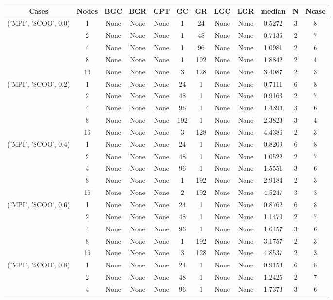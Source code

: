 \begin{tabular}{cccccccccccc}
\hline
Cases & Nodes& BGC& BGR& CPT& GC& GR& LGC& LGR& median & N & Ncase \\
\hline
\multirow{5}{*}{('MPI', 'SCOO', 0.0)}& 1& None& None& None& 1& 24& None& None& 0.5272& 3& 8\\
& 2& None& None& None& 1& 48& None& None& 0.7135& 2& 7\\
& 4& None& None& None& 1& 96& None& None& 1.0981& 2& 6\\
& 8& None& None& None& 1& 192& None& None& 1.8842& 2& 4\\
& 16& None& None& None& 3& 128& None& None& 3.4087& 2& 3\\
\hline
\multirow{5}{*}{('MPI', 'SCOO', 0.2)}& 1& None& None& None& 24& 1& None& None& 0.7111& 6& 8\\
& 2& None& None& None& 48& 1& None& None& 0.9163& 2& 7\\
& 4& None& None& None& 96& 1& None& None& 1.4394& 3& 6\\
& 8& None& None& None& 192& 1& None& None& 2.3823& 3& 4\\
& 16& None& None& None& 3& 128& None& None& 4.4386& 2& 3\\
\hline
\multirow{5}{*}{('MPI', 'SCOO', 0.4)}& 1& None& None& None& 24& 1& None& None& 0.8209& 6& 8\\
& 2& None& None& None& 48& 1& None& None& 1.0522& 2& 7\\
& 4& None& None& None& 96& 1& None& None& 1.5551& 3& 6\\
& 8& None& None& None& 1& 192& None& None& 2.9184& 2& 3\\
& 16& None& None& None& 2& 192& None& None& 4.5247& 3& 3\\
\hline
\multirow{5}{*}{('MPI', 'SCOO', 0.6)}& 1& None& None& None& 24& 1& None& None& 0.8762& 6& 8\\
& 2& None& None& None& 48& 1& None& None& 1.1479& 2& 7\\
& 4& None& None& None& 96& 1& None& None& 1.6457& 3& 6\\
& 8& None& None& None& 1& 192& None& None& 3.1757& 2& 3\\
& 16& None& None& None& 3& 128& None& None& 4.8537& 2& 3\\
\hline
\multirow{5}{*}{('MPI', 'SCOO', 0.8)}& 1& None& None& None& 24& 1& None& None& 0.9153& 6& 8\\
& 2& None& None& None& 48& 1& None& None& 1.2425& 2& 7\\
& 4& None& None& None& 96& 1& None& None& 1.7373& 3& 6\\

\end{tabular}
